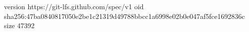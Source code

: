 version https://git-lfs.github.com/spec/v1
oid sha256:47ba0840817050e2be1c21319d49788bbcc1a6998e02b0e047af5fce1692836c
size 47392
